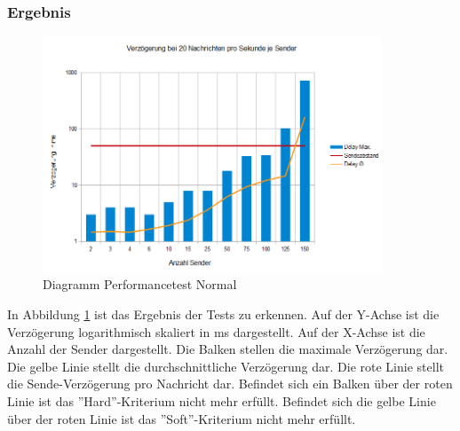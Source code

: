 \subsubsection{Ergebnis}
\begin{figure}[htH]
\centering
\includegraphics[width=0.9\textwidth]{backend/Diagramm_Performance_Normal.PNG}
\caption{Diagramm Performancetest Normal}
\label{backfig14}
\end{figure}
In Abbildung \ref{backfig14} ist das Ergebnis der Tests zu erkennen. 
Auf der Y-Achse ist die Verzögerung logarithmisch skaliert in ms dargestellt.
Auf der X-Achse ist die Anzahl der Sender dargestellt.
Die Balken stellen die maximale Verzögerung dar. 
Die gelbe Linie stellt die durchschnittliche Verzögerung dar.
Die rote Linie stellt die Sende-Verzögerung pro Nachricht dar.
Befindet sich ein Balken über der roten Linie ist das ''Hard''-Kriterium nicht mehr erfüllt.
Befindet sich die gelbe Linie über der roten Linie ist das ''Soft''-Kriterium nicht mehr erfüllt.



